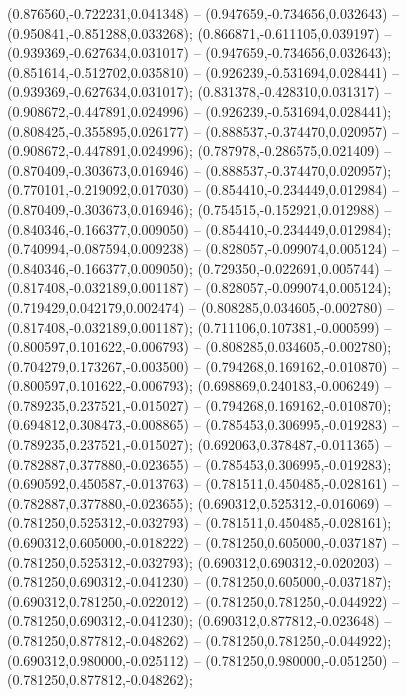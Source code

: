  (0.876560,-0.722231,0.041348) -- (0.947659,-0.734656,0.032643) -- (0.950841,-0.851288,0.033268);
 (0.866871,-0.611105,0.039197) -- (0.939369,-0.627634,0.031017) -- (0.947659,-0.734656,0.032643);
 (0.851614,-0.512702,0.035810) -- (0.926239,-0.531694,0.028441) -- (0.939369,-0.627634,0.031017);
 (0.831378,-0.428310,0.031317) -- (0.908672,-0.447891,0.024996) -- (0.926239,-0.531694,0.028441);
 (0.808425,-0.355895,0.026177) -- (0.888537,-0.374470,0.020957) -- (0.908672,-0.447891,0.024996);
 (0.787978,-0.286575,0.021409) -- (0.870409,-0.303673,0.016946) -- (0.888537,-0.374470,0.020957);
 (0.770101,-0.219092,0.017030) -- (0.854410,-0.234449,0.012984) -- (0.870409,-0.303673,0.016946);
 (0.754515,-0.152921,0.012988) -- (0.840346,-0.166377,0.009050) -- (0.854410,-0.234449,0.012984);
 (0.740994,-0.087594,0.009238) -- (0.828057,-0.099074,0.005124) -- (0.840346,-0.166377,0.009050);
 (0.729350,-0.022691,0.005744) -- (0.817408,-0.032189,0.001187) -- (0.828057,-0.099074,0.005124);
 (0.719429,0.042179,0.002474) -- (0.808285,0.034605,-0.002780) -- (0.817408,-0.032189,0.001187);
 (0.711106,0.107381,-0.000599) -- (0.800597,0.101622,-0.006793) -- (0.808285,0.034605,-0.002780);
 (0.704279,0.173267,-0.003500) -- (0.794268,0.169162,-0.010870) -- (0.800597,0.101622,-0.006793);
 (0.698869,0.240183,-0.006249) -- (0.789235,0.237521,-0.015027) -- (0.794268,0.169162,-0.010870);
 (0.694812,0.308473,-0.008865) -- (0.785453,0.306995,-0.019283) -- (0.789235,0.237521,-0.015027);
 (0.692063,0.378487,-0.011365) -- (0.782887,0.377880,-0.023655) -- (0.785453,0.306995,-0.019283);
 (0.690592,0.450587,-0.013763) -- (0.781511,0.450485,-0.028161) -- (0.782887,0.377880,-0.023655);
 (0.690312,0.525312,-0.016069) -- (0.781250,0.525312,-0.032793) -- (0.781511,0.450485,-0.028161);
 (0.690312,0.605000,-0.018222) -- (0.781250,0.605000,-0.037187) -- (0.781250,0.525312,-0.032793);
 (0.690312,0.690312,-0.020203) -- (0.781250,0.690312,-0.041230) -- (0.781250,0.605000,-0.037187);
 (0.690312,0.781250,-0.022012) -- (0.781250,0.781250,-0.044922) -- (0.781250,0.690312,-0.041230);
 (0.690312,0.877812,-0.023648) -- (0.781250,0.877812,-0.048262) -- (0.781250,0.781250,-0.044922);
 (0.690312,0.980000,-0.025112) -- (0.781250,0.980000,-0.051250) -- (0.781250,0.877812,-0.048262);
